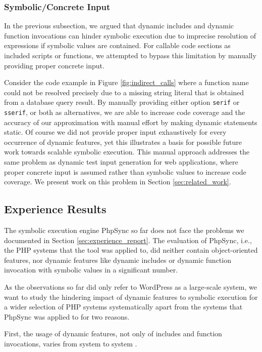 \documentclass[sigconf]{acmart}
\renewcommand{\sf}[1]{\textsf{#1}}
\renewcommand{\tt}[1]{\texttt{#1}}
\begin{document}
\subsubsection{Symbolic/Concrete Input}
In the previous subsection, we argued that dynamic includes and dynamic
function invocations can hinder symbolic execution due to imprecise resolution
of expressions if symbolic values are contained. For callable code sections as
included scripts or functions, we attempted to bypass this limitation
by manually providing proper concrete input.

Consider the code example in Figure \ref{fig:indirect_calls} where a function
name could not be resolved precisely due to a missing string literal that is
obtained from a database query result. By manually providing either option
\tt{serif} or \tt{sserif}, or both as alternatives, we are able to increase code coverage and
the accuracy of our approximation with manual effort by making dynamic
statements static. Of course we did not provide proper input exhaustively for
every occurrence of dynamic features, yet this illustrates a basis for possible
future work towards scalable symbolic execution. This manual approach addresses
the same problem as dynamic test input generation for web applications, where
proper concrete input is assumed rather than symbolic values to increase code
coverage. We present work on this problem in Section \ref{sec:related_work}.

\subsection{Experience Results} \label{sec:experience_results}
The symbolic execution engine \sf{PhpSync} \cite{Nguyen:2014:BCG:2635868.2635928} so far does not face the
problems we documented in Section \ref{sec:experience_report}. The evaluation of
\sf{PhpSyn}c, i.e., the PHP systems that the tool was applied to, did neither
contain object-oriented features, nor dynamic features like dynamic includes or dynamic function
invocation with symbolic values in a significant number.
 
As the observations so far did only refer to \sf{WordPress} as a large-scale
system, we want to study the hindering impact of dynamic features to symbolic
execution for a wider selection of PHP systems systematically apart from the
systems that \sf{PhpSync} was applied to for two reasons. 

First, the usage of dynamic features, not only of includes and function invocations, varies from
system to system \cite{hills2015variable}. 
\end{document}
